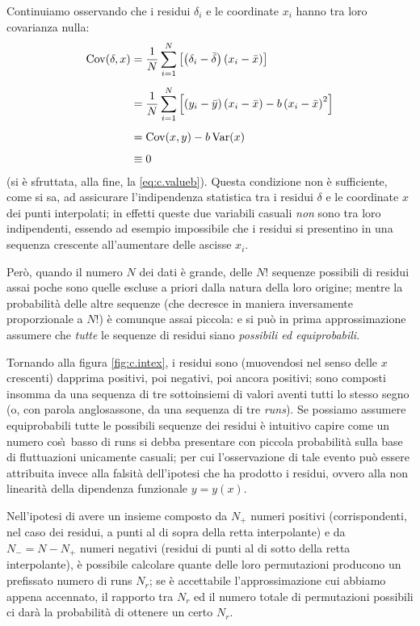 Continuiamo osservando che i residui $\delta_i$ e le
coordinate $x_i$ hanno tra loro covarianza nulla:
\begin{align*}
  \operatorname{Cov} (\delta, x) &= \frac{1}{N} \sum_{i=1}^N \left[ \left(
      \delta_i - \bar \delta \right) \left( x_i - \bar x
    \right) \right] \\[1ex]
  &= \frac{1}{N} \sum_{i=1}^N \left[ \left( y_i - \bar y
    \right) \left( x_i - \bar x \right) - b \left( x_i -
      \bar x \right)^2 \right] \\[1ex]
  &= \operatorname{Cov}(x, y) - b \operatorname{Var}(x) \\[1ex]
  &\equiv 0
\end{align*}
(si \`e sfruttata, alla fine, la \eqref{eq:c.valueb}).%
Questa condizione non \`e sufficiente, come si sa, ad
assicurare l'indipendenza statistica tra i residui $\delta$
e le coordinate $x$ dei punti interpolati; in effetti queste
due variabili casuali \emph{non} sono tra loro indipendenti,
essendo ad esempio impossibile che i residui si presentino
in una sequenza crescente all'aumentare delle ascisse $x_i$.

Per\`o, quando il numero $N$ dei dati \`e grande, delle $N!$
sequenze possibili di residui assai poche sono quelle
escluse a priori dalla natura della loro origine; mentre la
probabilit\`a delle altre sequenze (che decresce in maniera
inversamente proporzionale a $N!$) \`e comunque assai
piccola: e si pu\`o in prima approssimazione assumere che
\emph{tutte} le sequenze di residui siano \emph{possibili ed
  equiprobabili}.

Tornando alla figura \ref{fig:c.intex}, i residui sono
(muovendosi nel senso delle $x$ crescenti) dapprima
positivi, poi negativi, poi ancora positivi; sono composti
insomma da una sequenza di tre sottoinsiemi di valori aventi
tutti lo stesso segno (o, con parola anglosassone, da una
sequenza di tre \emph{runs}).  Se possiamo assumere
equiprobabili tutte le possibili sequenze dei residui \`e
intuitivo capire come un numero cos\`\i\ basso di runs si
debba presentare con piccola probabilit\`a sulla base di
fluttuazioni unicamente casuali; per cui l'osservazione di
tale evento pu\`o essere attribuita invece alla falsit\`a
dell'ipotesi che ha prodotto i residui, ovvero alla non
linearit\`a della dipendenza funzionale $y = y(x)$.

Nell'ipotesi di avere un insieme composto da $N_+$ numeri
positivi (corrispondenti, nel caso dei residui, a punti al
di sopra della retta interpolante) e da $N_- = N - N_+$
numeri negativi (residui di punti al di sotto della retta
interpolante), \`e possibile calcolare quante delle loro
permutazioni producono un prefissato numero di runs $N_r$;
se \`e accettabile l'approssimazione cui abbiamo appena
accennato, il rapporto tra $N_r$ ed il numero totale di
permutazioni possibili ci dar\`a la probabilit\`a di
ottenere un certo $N_r$.

